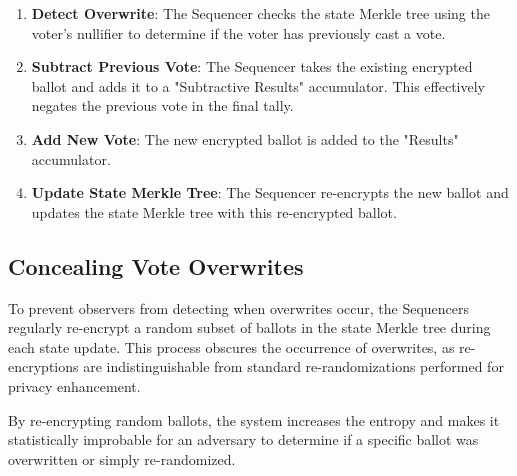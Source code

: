 \begin{enumerate}
	\item \textbf{Detect Overwrite}: The Sequencer checks the state Merkle tree using the voter's nullifier to determine if the voter has previously cast a vote.
	\item \textbf{Subtract Previous Vote}: The Sequencer takes the existing encrypted ballot and adds it to a "Subtractive Results" accumulator. This effectively negates the previous vote in the final tally.
	\item \textbf{Add New Vote}: The new encrypted ballot is added to the "Results" accumulator.
	\item \textbf{Update State Merkle Tree}: The Sequencer re-encrypts the new ballot and updates the state Merkle tree with this re-encrypted ballot.
\end{enumerate}

\subsection{Concealing Vote Overwrites}

To prevent observers from detecting when overwrites occur, the Sequencers regularly re-encrypt a random subset of ballots in the state Merkle tree during each state update. This process obscures the occurrence of overwrites, as re-encryptions are indistinguishable from standard re-randomizations performed for privacy enhancement.

By re-encrypting random ballots, the system increases the entropy and makes it statistically improbable for an adversary to determine if a specific ballot was overwritten or simply re-randomized.